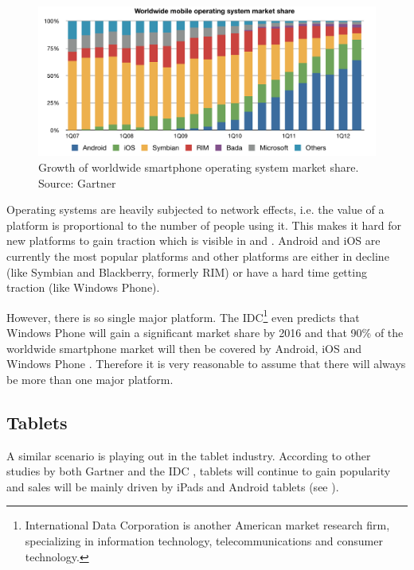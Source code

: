 \begin{figure}[h!]
    \begin{center}
        \includegraphics[width=\textwidth]{figs/smartphone_os.pdf}
        \caption{
            Growth of worldwide smartphone operating system market share.\newline 
            Source: Gartner \citeGartner
        	}
        \label{fig:smartphone-share}
    \end{center}
\end{figure}

Operating systems are heavily subjected to network effects, i.e. the value of a platform is proportional to the number of people using it. This makes it hard for new platforms to gain traction which is visible in  and . Android and iOS are currently the most popular platforms and other platforms are either in decline (like Symbian and Blackberry, formerly RIM) or have a hard time getting traction (like Windows Phone).

However, there is so single major platform. The IDC\footnote{International Data Corporation is another American market research firm, specializing in information technology, telecommunications and consumer technology.} even predicts that Windows Phone will gain a significant market share by 2016 and that 90\% of the worldwide smartphone market will then be covered by Android, iOS and Windows Phone \cite{IDC:phone}. Therefore it is very reasonable to assume that there will always be more than one major platform.

\subsection{Tablets}

A similar scenario is playing out in the tablet industry. According to other studies by both Gartner \citep{Gartner:11tab,Gartner:12tab} and the IDC \citep{IDC:tablet}, tablets will continue to gain popularity and sales will be mainly driven by iPads and Android tablets (see ).

